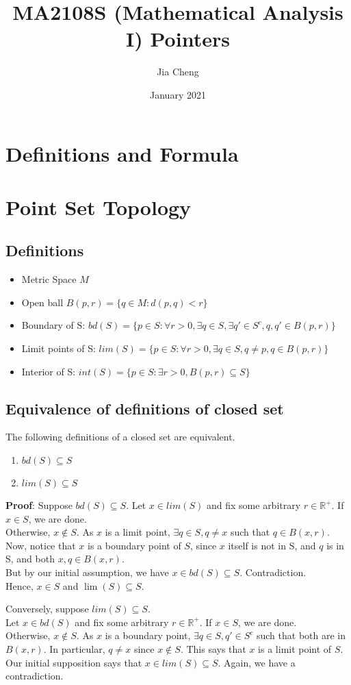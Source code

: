 \documentclass{article}
\title{MA2108S (Mathematical Analysis I) Pointers}
\author{Jia Cheng}
\date{January 2021}
\begin{document}
\maketitle

\section{Definitions and Formula}

\section{Point Set Topology}
\subsection{Definitions}
\begin{itemize}
	\item Metric Space $M$
	\item Open ball $B(p,r)=\{q\in M : d(p,q) < r \}$
	\item Boundary of S: $bd(S)=\{p\in S : \forall r > 0, \exists q\in S, \exists q'\in S^c, q,q'\in B(p,r) \}$
	\item Limit points of S: $lim(S)=\{p\in S : \forall r > 0, \exists q\in S, q\neq p, q\in B(p,r) \}$
	\item Interior of S: $int(S)=\{p\in S : \exists r > 0, B(p,r)\subseteq S\}$
\end{itemize}
\subsection{Equivalence of definitions of closed set}
The following definitions of a closed set are equivalent.

\begin{enumerate}
	\item $bd(S)\subseteq S$
	\item $lim(S)\subseteq S$
\end{enumerate}

\textbf{Proof}: Suppose $bd(S)\subseteq S$. 
Let $x\in lim(S)$ and fix some arbitrary $r\in \mathbb{R}^+$.
If $x\in S$, we are done.\\
Otherwise,  $x\not \in S$. As $x$ is a limit point, $\exists q\in S, q\neq x$ such that $q\in B(x,r)$. Now, notice that $x$ is a boundary point of $S$, since $x$ itself is not in S, and $q$ is in S, and both $x,q\in B(x,r)$.\\
But by our initial assumption, we have $x\in bd(S)\subseteq S$. Contradiction.\\
Hence, $x\in S$ and $\lim(S)\subseteq S$.

Conversely, suppose $lim(S)\subseteq S$.\\
Let $x\in bd(S)$ and fix some arbitrary $r\in \mathbb{R}^+$. If $x\in S$, we are done.\\
Otherwise, $x\not \in S$. As $x$ is a boundary point, $\exists q\in S, q' \in S^c$ such that both are in $B(x,r)$. In particular, $q\neq x$ since $x\not \in S$. This says that $x$ is a limit point of $S$.\\
Our initial supposition says that $x\in lim(S)\subseteq S$. Again, we have a contradiction.  
\end{document}
